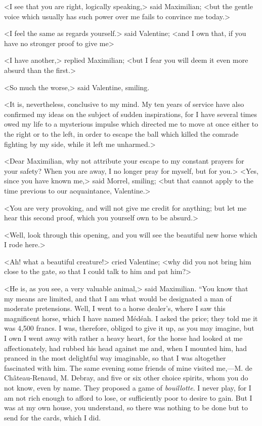  <I see that you are right, logically speaking,> said Maximilian; <but the gentle voice which usually has such power over me fails to convince me today.> 

 <I feel the same as regards yourself.> said Valentine; <and I own that, if you have no stronger proof to give me\longdash> 

 <I have another,> replied Maximilian; <but I fear you will deem it even more absurd than the first.> 

 <So much the worse,> said Valentine, smiling. 

 <It is, nevertheless, conclusive to my mind. My ten years of service have also confirmed my ideas on the subject of sudden inspirations, for I have several times owed my life to a mysterious impulse which directed me to move at once either to the right or to the left, in order to escape the ball which killed the comrade fighting by my side, while it left me unharmed.> 

 <Dear Maximilian, why not attribute your escape to my constant prayers for your safety? When you are away, I no longer pray for myself, but for you.>  <Yes, since you have known me,> said Morrel, smiling; <but that cannot apply to the time previous to our acquaintance, Valentine.> 

 <You are very provoking, and will not give me credit for anything; but let me hear this second proof, which you yourself own to be absurd.> 

 <Well, look through this opening, and you will see the beautiful new horse which I rode here.> 

 <Ah! what a beautiful creature!> cried Valentine; <why did you not bring him close to the gate, so that I could talk to him and pat him?> 

 <He is, as you see, a very valuable animal,> said Maximilian. “You know that my means are limited, and that I am what would be designated a man of moderate pretensions. Well, I went to a horse dealer's, where I saw this magnificent horse, which I have named Médéah. I asked the price; they told me it was 4,500 francs. I was, therefore, obliged to give it up, as you may imagine, but I own I went away with rather a heavy heart, for the horse had looked at me affectionately, had rubbed his head against me and, when I mounted him, had pranced in the most delightful way imaginable, so that I was altogether fascinated with him. The same evening some friends of mine visited me,—M. de Château-Renaud, M. Debray, and five or six other choice spirits, whom you do not know, even by name. They proposed a game of \textit{bouillotte}. I never play, for I am not rich enough to afford to lose, or sufficiently poor to desire to gain. But I was at my own house, you understand, so there was nothing to be done but to send for the cards, which I did. 

